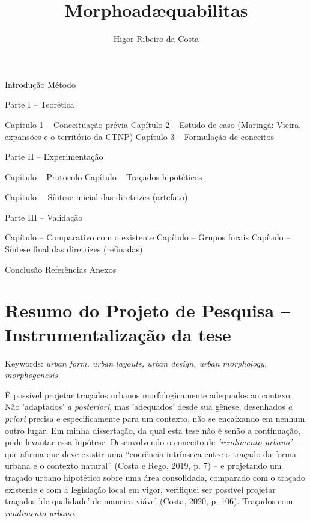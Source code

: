 \documentclass[]{report}
\title{Morphoadæquabilitas}
\author{Higor Ribeiro da Costa}
\begin{document}
\maketitle

\tableofcontents
Introdução
Método

Parte I – Teorética

    Capítulo 1 – Conceituação prévia
    Capítulo 2 – Estudo de caso (Maringá: Vieira, expansões e o território da CTNP)
    Capítulo 3 – Formulação de conceitos

Parte II – Experimentação
    
    Capítulo – Protocolo
    Capítulo – Traçados hipotéticos
    
    Capítulo – Síntese inicial das diretrizes (artefato)

Parte III – Validação
    
    Capítulo – Comparativo com o existente
    Capítulo – Grupos focais
    Capítulo – Síntese final das diretrizes (refinadas)

Conclusão
Referências
Anexos

\begin{abstract}
\end{abstract}

\setcounter{secnumdepth}{0}

\chapter*{Resumo do Projeto de Pesquisa – Instrumentalização da tese}

    Keywords: \textit{urban form, urban layouts, urban design, urban morphology, morphogenesis}

    É possível projetar traçados urbanos morfologicamente adequados ao contexo. Não 'adaptados' \textit{a posteriori}, mas 'adequados' desde sua gênese, desenhados \textit{a priori} precisa e especificamente para um contexto, não se encaixando em nenhum outro lugar. Em minha dissertação, da qual esta tese não é senão a continuação, pude levantar essa hipótese. Desenvolvendo o conceito de \textit{'rendimento urbano'} – que afirma que deve existir uma “coerência intrínseca entre o traçado da forma urbana e o contexto natural” (Costa e Rego, 2019, p. 7) – e projetando um  traçado urbano hipotético sobre uma área consolidada, comparado com o traçado existente e com a legislação local em vigor, verifiquei ser possível projetar traçados 'de qualidade' de maneira viável (Costa, 2020, p. 106). Traçados com \textit{rendimento urbano}.
\end{document}
